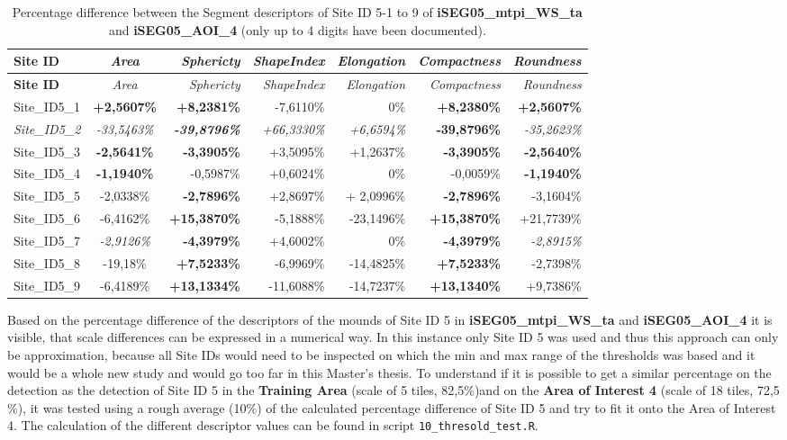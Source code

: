 \documentclass[
  12pt,
]{article}
\begin{document}
\begin{longtable}[]{@{}lcrrrrr@{}}
\caption{Percentage difference between the Segment descriptors of Site ID 5-1 to 9 of \textbf{iSEG05\_mtpi\_WS\_ta} and \textbf{iSEG05\_AOI\_4} (only up to 4 digits have been documented).}\tabularnewline
\toprule
\textbf{Site ID} & \emph{Area} & \emph{Sphericty} & \emph{ShapeIndex} & \emph{Elongation} & \emph{Compactness} & \emph{Roundness} \\
\midrule
\endfirsthead
\toprule
\textbf{Site ID} & \emph{Area} & \emph{Sphericty} & \emph{ShapeIndex} & \emph{Elongation} & \emph{Compactness} & \emph{Roundness} \\
\midrule
\endhead
Site\_ID5\_1 & \textbf{+2,5607\%} & \textbf{+8,2381\%} & -7,6110\% & 0\% & \textbf{+8,2380\%} & \textbf{+2,5607\% } \\
\emph{Site\_ID5\_2} & \emph{-33,5463\%} & \textbf{\emph{-39,8796\% }} & \emph{+66,3330\%} & \emph{+6,6594\%} & \textbf{-39,8796\%} & \emph{-35,2623\%} \\
Site\_ID5\_3 & \textbf{-2,5641\%} & \textbf{-3,3905\%} & +3,5095\% & +1,2637\% & \textbf{-3,3905\%} & \textbf{-2,5640\%} \\
Site\_ID5\_4 & \textbf{-1,1940\%} & -0,5987\% & +0,6024\% & 0\% & -0,0059\% & \textbf{-1,1940\%} \\
Site\_ID5\_5 & -2,0338\% & \textbf{-2,7896\%} & +2,8697\% & + 2,0996\% & \textbf{-2,7896\%} & -3,1604\% \\
Site\_ID5\_6 & -6,4162\% & \textbf{+15,3870\%} & -5,1888\% & -23,1496\% & \textbf{+15,3870\%} & +21,7739\% \\
Site\_ID5\_7 & \emph{-2,9126\%} & \textbf{-4,3979\%} & +4,6002\% & 0\% & \textbf{-4,3979\%} & \emph{-2,8915\%} \\
Site\_ID5\_8 & -19,18\% & \textbf{+7,5233\%} & -6,9969\% & -14,4825\% & \textbf{+7,5233\%} & -2,7398\% \\
Site\_ID5\_9 & -6,4189\% & \textbf{+13,1334\%} & -11,6088\% & -14,7237\% & \textbf{+13,1340\%} & +9,7386\% \\
\bottomrule
\end{longtable}

Based on the percentage difference of the descriptors of the mounds of Site ID 5 in \textbf{iSEG05\_mtpi\_WS\_ta} and \textbf{iSEG05\_AOI\_4} it is visible, that scale differences can be expressed in a numerical way. In this instance only Site ID 5 was used and thus this approach can only be approximation, because all Site IDs would need to be inspected on which the min and max range of the thresholds was based and it would be a whole new study and would go too far in this Master's thesis.
To understand if it is possible to get a similar percentage on the detection as the detection of Site ID 5 in the \textbf{Training Area} (scale of 5 tiles, 82,5\%)and on the \textbf{Area of Interest 4} (scale of 18 tiles, 72,5 \%), it was tested using a rough average (10\%) of the calculated percentage difference of Site ID 5 and try to fit it onto the Area of Interest 4. The calculation of the different descriptor values can be found in script \texttt{10\_thresold\_test.R}.
\end{document}

